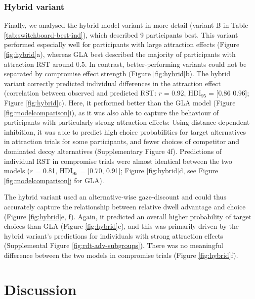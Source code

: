 \documentclass[11pt, a4paper]{article}
\begin{document}
\subsubsection*{Hybrid variant}

Finally, we analysed the hybrid model variant in more detail (variant B in Table \ref{tab:switchboard-best-ind}), which described 9 participants best. This variant performed especially well for participants with large attraction effects (Figure \ref{fig:hybrid}a), whereas GLA best described the majority of participants with attraction RST around 0.5. In contrast, better-performing variants could not be separated by compromise effect strength (Figure \ref{fig:hybrid}b). The hybrid variant correctly predicted individual differences in the attraction effect (correlation between observed and predicted RST: $r$ = 0.92, HDI$_{95}$ = [0.86 0.96]; Figure \ref{fig:hybrid}c). Here, it performed better than the GLA model (Figure \ref{fig:modelcomparison}i), as it was also able to capture the behaviour of participants with particularly strong attraction effects: Using distance-dependent inhibition, it was able to predict high choice probabilities for target alternatives in attraction trials for some participants, and fewer choices of competitor and dominated decoy alternatives (Supplementary Figure 4f). Predictions of individual RST in compromise trials were almost identical between the two models ($r$ = 0.81, HDI$_{95}$ = [0.70, 0.91]; Figure \ref{fig:hybrid}d, see Figure \ref{fig:modelcomparison}j for GLA). 

The hybrid variant used an alternative-wise gaze-discount and could thus accurately capture the relationship between relative dwell advantage and choice (Figure \ref{fig:hybrid}e, f). Again, it predicted an overall higher probability of target choices than GLA (Figure \ref{fig:hybrid}e), and this was primarily driven by the hybrid variant’s predictions for individuals with strong attraction effects (Supplemental Figure \ref{fig:rdt-adv-subgroups}). There was no meaningful difference between the two models in compromise trials (Figure \ref{fig:hybrid}f).

\section*{Discussion}
\end{document}
